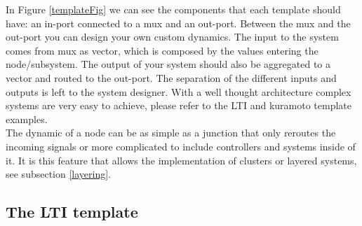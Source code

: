 \documentclass[a4paper,twoside, openright,12pt]{report}
\begin{document}
In Figure \ref{templateFig} we can see the components that each template should have: an in-port connected to a mux and an out-port.
Between the mux and the out-port you can design your own custom dynamics. The input to the system comes from mux as vector, which is composed by the values
entering the node/subsystem. The output of your system should also be aggregated to a vector and routed to the out-port. The separation of the different inputs and outputs 
is left to the system designer. With a well thought architecture complex systems are very easy to achieve, please refer to the LTI and kuramoto template examples.  
\\

The dynamic of a node can be as simple as a junction that only reroutes the incoming signals or more complicated to include controllers and systems inside of it. It is this feature that allows
the implementation of clusters or layered systems, see subsection \ref{layering}. 


\subsection{The LTI template}
\end{document}
